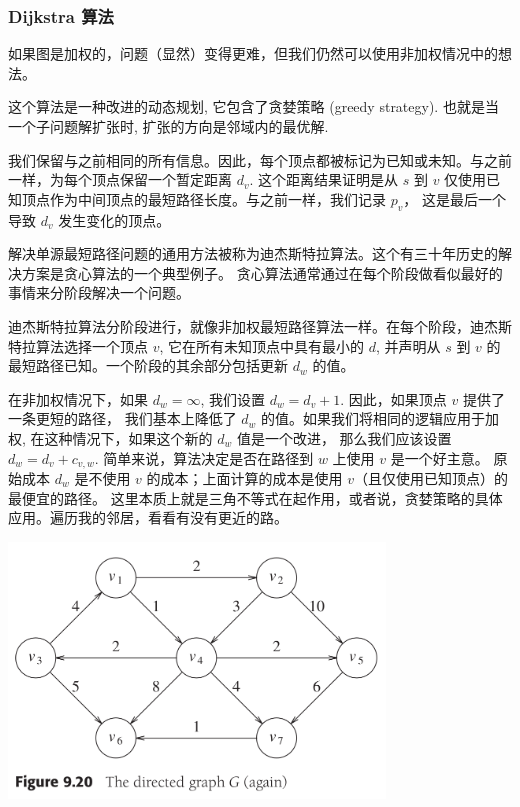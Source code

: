 \documentclass[a4paper]{ctexart}
\theoremstyle{definition}
\theoremstyle{definition}
\begin{document}
\subsubsection*{Dijkstra 算法}

如果图是加权的，问题（显然）变得更难，但我们仍然可以使用非加权情况中的想法。

这个算法是一种改进的动态规划, 它包含了贪婪策略 (greedy strategy). 也就是当一个子问题解扩张时,
扩张的方向是邻域内的最优解. 

我们保留与之前相同的所有信息。因此，每个顶点都被标记为已知或未知。与之前一样，为每个顶点保留一个暂定距离 \( d_v \). 
这个距离结果证明是从 \( s \) 到 \( v \) 仅使用已知顶点作为中间顶点的最短路径长度。与之前一样，我们记录 \( p_v \)，
这是最后一个导致 \( d_v \) 发生变化的顶点。

解决单源最短路径问题的通用方法被称为迪杰斯特拉算法。这个有三十年历史的解决方案是贪心算法的一个典型例子。
贪心算法通常通过在每个阶段做看似最好的事情来分阶段解决一个问题。

迪杰斯特拉算法分阶段进行，就像非加权最短路径算法一样。在每个阶段，迪杰斯特拉算法选择一个顶点 \( v \), 它在所有未知顶点中具有最小的 \( d \), 
并声明从 \( s \) 到 \( v \) 的最短路径已知。一个阶段的其余部分包括更新 \( d_w \) 的值。

在非加权情况下，如果 \( d_w = \infty \), 我们设置 \( d_w = d_v + 1 \). 因此，如果顶点 \( v \) 提供了一条更短的路径，
我们基本上降低了 \( d_w \) 的值。如果我们将相同的逻辑应用于加权, 在这种情况下，如果这个新的 \( d_w \) 值是一个改进，
那么我们应该设置 \( d_w = d_v + c_{v, w} \). 简单来说，算法决定是否在路径到 \( w \) 上使用 \( v \) 是一个好主意。
原始成本 \( d_w \) 是不使用 \( v \) 的成本；上面计算的成本是使用 \( v \)（且仅使用已知顶点）的最便宜的路径。
这里本质上就是三角不等式在起作用，或者说，贪婪策略的具体应用。遍历我的邻居，看看有没有更近的路。


\begin{center}
  \includegraphics[width=0.75\textwidth]{images/FIG9_20.png}
\end{center}
\end{document}
